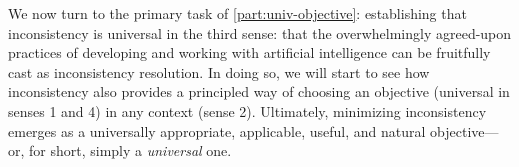 {%
We now turn to the primary task of \cref{part:univ-objective}: establishing that inconsistency is universal in the third sense: that the overwhelmingly agreed-upon practices of developing and working with artificial intelligence can be fruitfully cast as inconsistency resolution. 
In doing so, we will start to see how inconsistency also provides a principled way of choosing an objective (universal in senses 1 and 4) in any context (sense 2).
Ultimately, minimizing inconsistency emerges as a universally appropriate, applicable, useful, and natural objective---or, for short, simply a \emph{universal} one. 


}%


%
